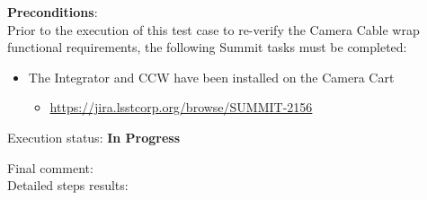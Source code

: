 \documentclass[SE,lsstdraft,STR,toc]{lsstdoc}
\providecommand{\tightlist}{
  \setlength{\itemsep}{0pt}\setlength{\parskip}{0pt}}
\begin{document}
\textbf{ Preconditions}:\\
Prior to the execution of this test case to re-verify the Camera Cable
wrap functional requirements, the following Summit tasks must be
completed:

\begin{itemize}
\tightlist
\item
  The Integrator and CCW have been installed on the Camera Cart

  \begin{itemize}
  \tightlist
  \item
    \url{https://jira.lsstcorp.org/browse/SUMMIT-2156}
  \end{itemize}
\end{itemize}


Execution status: {\bf In Progress }

Final comment:\\


Detailed steps results:
\end{document}
